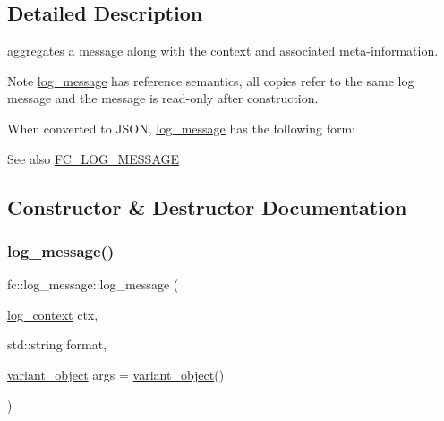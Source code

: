 \subsection{Detailed Description}
aggregates a message along with the context and associated meta-\/information. 

\begin{DoxyNote}{Note}
\mbox{\hyperlink{classfc_1_1log__message}{log\+\_\+message}} has reference semantics, all copies refer to the same log message and the message is read-\/only after construction.
\end{DoxyNote}
When converted to J\+S\+ON, \mbox{\hyperlink{classfc_1_1log__message}{log\+\_\+message}} has the following form\+: 


\begin{DoxySeeAlso}{See also}
\mbox{\hyperlink{log__message_8hpp_a4a4df4bb5cffbe07aadf7d29fd44c75e}{F\+C\+\_\+\+L\+O\+G\+\_\+\+M\+E\+S\+S\+A\+GE}} 
\end{DoxySeeAlso}


\subsection{Constructor \& Destructor Documentation}
\mbox{\label{classfc_1_1log__message_adfaa2f16f929cfb23f15fc4b60b8e530}} 
\subsubsection{\texorpdfstring{log\+\_\+message()}{log\_message()}}
{\footnotesize\ttfamily fc\+::log\+\_\+message\+::log\+\_\+message (\begin{DoxyParamCaption}\item[{\mbox{\hyperlink{classfc_1_1log__context}{log\+\_\+context}}}]{ctx,  }\item[{std\+::string}]{format,  }\item[{\mbox{\hyperlink{classfc_1_1variant__object}{variant\+\_\+object}}}]{args = {\ttfamily \mbox{\hyperlink{classfc_1_1variant__object}{variant\+\_\+object}}()} }\end{DoxyParamCaption})}


